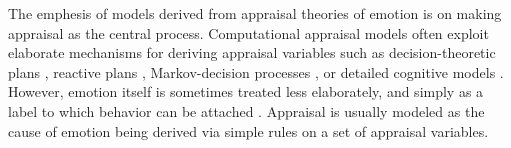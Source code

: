 \documentclass[11pt]{article}
\begin{document}
The emphesis of models derived from appraisal theories of emotion is on
making appraisal as the central process. Computational appraisal models often
exploit elaborate mechanisms for deriving appraisal variables such as
decision-theoretic plans \cite{gratch:domain-independent}
\cite{marsella:ema-process-model}, reactive plans
\cite{rank:appraisal-story-world} \cite{neal:modeling-antecedents}
\cite{staller:emotion-social-norm}, Markov-decision processes
\cite{elnasr:flame} \cite{si:modeling-appraisal-tom-journal}, or detailed
cognitive models \cite{marinier:behavior-emotion}. However, emotion itself is
sometimes treated less elaborately, and simply as a label to which behavior can
be attached \cite{elliott:affective-reasoner}. Appraisal is usually modeled as
the cause of emotion being derived via simple rules on a set of appraisal
variables.
\end{document}
